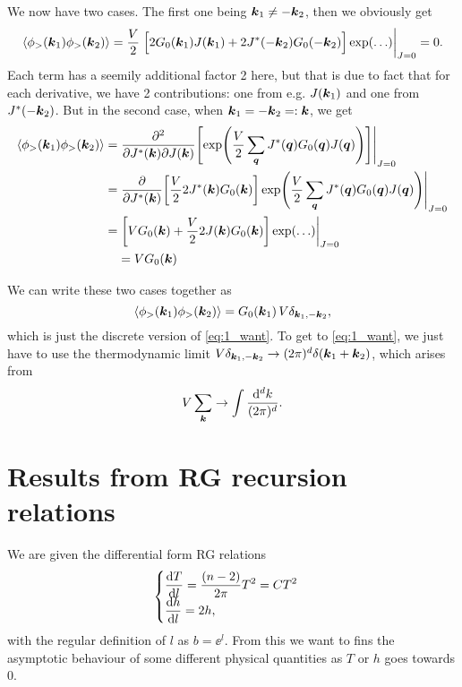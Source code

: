 \documentclass[11pt,letter, swedish, english
]{article}
\begin{document}
We now have two cases. The first one being $\vb*k_1\neq-\vb*k_2$, then
we obviously get
\begin{equation}
\begin{aligned}
\ev{\phi_>(\vb*k_1)\phi_>(\vb*k_2)} 
= \frac{V}{2}\eval{\Big[
2G_0(\vb*k_1)J(\vb*k_1) + 2J^*(-\vb*k_2)G_0(-\vb*k_2)
\Big]\exp(\ldots)}_{J=0} = 0.
\end{aligned}
\end{equation}
Each term has a seemily additional factor 2 here, but that is due to
fact that for each derivative, we have 2 contributions: one from e.g.
$J(\vb*k_1)$ and one from $J^*(-\vb*k_2)$.
But in the second case, when $\vb*k_1=-\vb*k_2=:\vb*k$, we get
\begin{equation}
\begin{aligned}
\ev{\phi_>(\vb*k_1)\phi_>(\vb*k_2)} 
=&\eval{\pdv[2]{}{J^*(\vb*k)}{J(\vb*k)}
\qty[\exp(\frac{V}{2} \sum_{\vb*q}
J^*(\vb*q)G_0(\vb*q)J(\vb*q))]}_{J=0}\\
=&\eval{\pdv{J^*(\vb*k)}\qty[\frac{V}{2} 
2J^*(\vb*k)G_0(\vb*k)]\exp(\frac{V}{2} \sum_{\vb*q}
J^*(\vb*q)G_0(\vb*q)J(\vb*q))
}_{J=0}\\
=&\eval{\qty[VG_0(\vb*k) + \frac{V}{2} 
2J(\vb*k)G_0(\vb*k)]\exp(\ldots)
}_{J=0}\\
&=VG_0(\vb*k)
\end{aligned}
\end{equation}

We can write these two cases together as
\begin{equation}
\ev{\phi_>(\vb*k_1)\phi_>(\vb*k_2)} 
=G_0(\vb*k_1) \,V\delta_{\vb*k_1, -\vb*k_2},
\end{equation}
which is just the discrete version of \eqref{eq:1_want}. To get to
\eqref{eq:1_want}, we just have to use the thermo\-dynamic limit
$V\delta_{\vb*k_1, -\vb*k_2} \to (2\pi)^d\delta(\vb*k_1+\vb*k_2)$,
which arises from 
\begin{equation}
V\sum_{\vb*k} \to \int\frac{\rd^dk}{(2\pi)^d}.
\end{equation}







\section{Results from RG recursion relations}
\newcommand{\TT}{\tilde{T}}
\newcommand{\hT}{\tilde{h}}
\newcommand{\fs}{f_{\text{s}}}
We are given the differential form RG relations
\begin{equation}\label{eq:2_RG}
\begin{cases}\displaystyle
\dv{T}{l} = \frac{(n-2)}{2\pi}T^2 = CT^2
\\ \displaystyle
\dv{h}{l} = 2h,
\end{cases}
\end{equation}
with the regular definition of $l$ as $b=\ee^l$. From this we want to
fins the asymptotic behaviour of some different physical quantities as
$T$ or $h$ goes towards $0$.  
\end{document}
